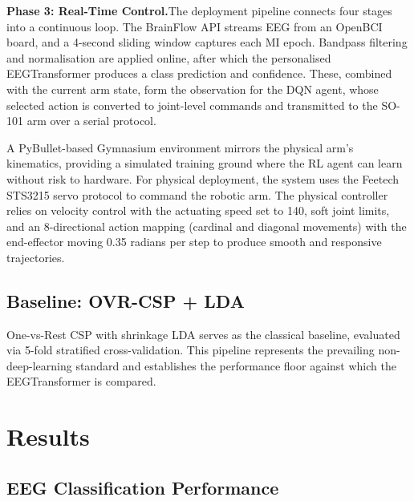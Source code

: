 \documentclass[12pt, a4paper]{article}
\begin{document}
\textbf{Phase 3: Real-Time Control.}\quad The deployment pipeline connects four stages into a continuous loop. The BrainFlow API streams EEG from an OpenBCI board, and a 4-second sliding window captures each MI epoch. Bandpass filtering and normalisation are applied online, after which the personalised EEGTransformer produces a class prediction and confidence. These, combined with the current arm state, form the observation for the DQN agent, whose selected action is converted to joint-level commands and transmitted to the SO-101 arm over a serial protocol.

A PyBullet-based Gymnasium environment mirrors the physical arm's kinematics, providing a simulated training ground where the RL agent can learn without risk to hardware. For physical deployment, the system uses the Feetech STS3215 servo protocol to command the robotic arm. The physical controller relies on velocity control with the actuating speed set to 140, soft joint limits, and an 8-directional action mapping (cardinal and diagonal movements) with the end-effector moving 0.35 radians per step to produce smooth and responsive trajectories.

\subsection{Baseline: OVR-CSP + LDA}

One-vs-Rest CSP with shrinkage LDA serves as the classical baseline, evaluated via 5-fold stratified cross-validation. This pipeline represents the prevailing non-deep-learning standard and establishes the performance floor against which the EEGTransformer is compared.

\section{Results}

\subsection{EEG Classification Performance}
\end{document}
